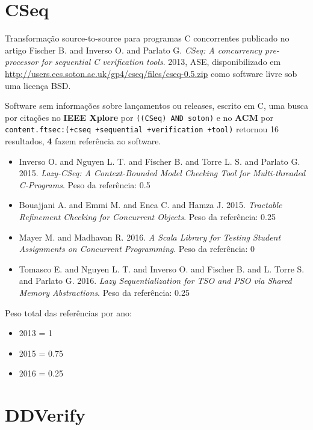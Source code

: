 \section{CSeq}

Transformação source-to-source para programas C concorrentes
publicado no artigo
Fischer B. and Inverso O. and Parlato G.
{\it CSeq: A concurrency pre-processor for sequential C verification tools}.
2013,
ASE,
disponibilizado em \url{http://users.ecs.soton.ac.uk/gp4/cseq/files/cseq-0.5.zip}
como software livre
sob uma licença BSD.

Software sem informações sobre lançamentos ou releases,
escrito em C,
uma busca por citações no {\bf IEEE Xplore} por
\texttt{((CSeq) AND soton)}
e no {\bf ACM} por
\texttt{content.ftsec:(+cseq +sequential +verification +tool)}
retornou
16 resultados,
{\bf 4} fazem referência ao software.

\begin{itemize}
\item Inverso O. and Nguyen L. T. and Fischer B. and Torre L. S. and Parlato G.
      2015.
      {\it Lazy-CSeq: A Context-Bounded Model Checking Tool for Multi-threaded C-Programs}.
      Peso da referência: 0.5
\item Bouajjani A. and Emmi M. and Enea C. and Hamza J.
      2015.
      {\it Tractable Refinement Checking for Concurrent Objects}.
      Peso da referência: 0.25
\item Mayer M. and Madhavan R.
      2016.
      {\it A Scala Library for Testing Student Assignments on Concurrent Programming}.
      Peso da referência: 0
\item Tomasco E. and Nguyen L. T. and Inverso O. and Fischer B. and L. Torre S. and Parlato G.
      2016.
      {\it Lazy Sequentialization for TSO and PSO via Shared Memory Abstractions}.
      Peso da referência: 0.25
\end{itemize}

Peso total das referências por ano:

\begin{itemize}
\item 2013 = 1
\item 2015 = 0.75
\item 2016 = 0.25
\end{itemize}


\section{DDVerify}

